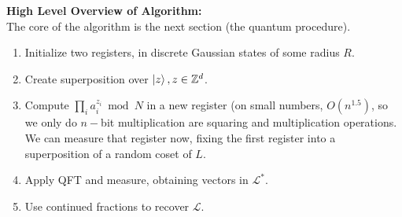 \documentclass{article}
\begin{document}
\textbf{High Level Overview of Algorithm:}\\
The core of the algorithm is the next section (the quantum procedure).
\begin{enumerate}
	\item Initialize two registers, in discrete Gaussian states of some radius $R$.
	\item Create superposition over $\ket{z}, z \in \mathbb{Z}^d$.
	\item Compute $\prod_i a_{i}^{z_i} \bmod N$ in a new register (on small numbers, $O(n^{1.5})$, so we only do $n-$bit multiplication are squaring and multiplication operations. We can measure that register now, fixing the first register into a superposition of a random coset of $L$.\\
	\item Apply QFT and measure, obtaining vectors in $\mathcal{L}^*$.
	\item Use continued fractions to recover $\mathcal{L}$.
\end{enumerate}
\end{document}
